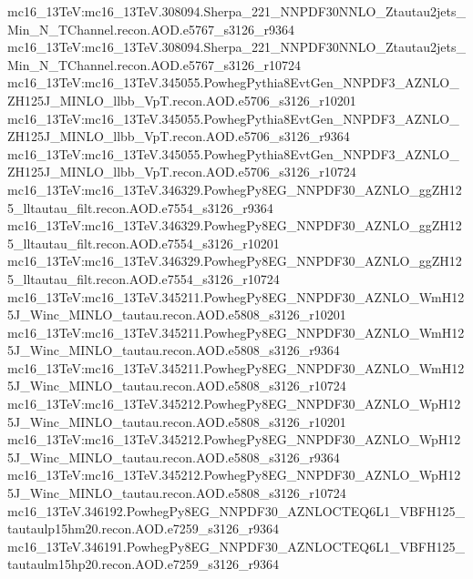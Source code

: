 { mc16\_13TeV:mc16\_13TeV.308094.Sherpa\_221\_NNPDF30NNLO\_Ztautau2jets\_Min\_N\_TChannel.recon.AOD.e5767\_s3126\_r9364 \newline    
 mc16\_13TeV:mc16\_13TeV.308094.Sherpa\_221\_NNPDF30NNLO\_Ztautau2jets\_Min\_N\_TChannel.recon.AOD.e5767\_s3126\_r10724  \newline  
 mc16\_13TeV:mc16\_13TeV.345055.PowhegPythia8EvtGen\_NNPDF3\_AZNLO\_ZH125J\_MINLO\_llbb\_VpT.recon.AOD.e5706\_s3126\_r10201  \newline   
 mc16\_13TeV:mc16\_13TeV.345055.PowhegPythia8EvtGen\_NNPDF3\_AZNLO\_ZH125J\_MINLO\_llbb\_VpT.recon.AOD.e5706\_s3126\_r9364  \newline   
 mc16\_13TeV:mc16\_13TeV.345055.PowhegPythia8EvtGen\_NNPDF3\_AZNLO\_ZH125J\_MINLO\_llbb\_VpT.recon.AOD.e5706\_s3126\_r10724  \newline   
 mc16\_13TeV:mc16\_13TeV.346329.PowhegPy8EG\_NNPDF30\_AZNLO\_ggZH125\_lltautau\_filt.recon.AOD.e7554\_s3126\_r9364 \newline    
 mc16\_13TeV:mc16\_13TeV.346329.PowhegPy8EG\_NNPDF30\_AZNLO\_ggZH125\_lltautau\_filt.recon.AOD.e7554\_s3126\_r10201  \newline   
 mc16\_13TeV:mc16\_13TeV.346329.PowhegPy8EG\_NNPDF30\_AZNLO\_ggZH125\_lltautau\_filt.recon.AOD.e7554\_s3126\_r10724  \newline   
 mc16\_13TeV:mc16\_13TeV.345211.PowhegPy8EG\_NNPDF30\_AZNLO\_WmH125J\_Winc\_MINLO\_tautau.recon.AOD.e5808\_s3126\_r10201  \newline   
 mc16\_13TeV:mc16\_13TeV.345211.PowhegPy8EG\_NNPDF30\_AZNLO\_WmH125J\_Winc\_MINLO\_tautau.recon.AOD.e5808\_s3126\_r9364 \newline    
 mc16\_13TeV:mc16\_13TeV.345211.PowhegPy8EG\_NNPDF30\_AZNLO\_WmH125J\_Winc\_MINLO\_tautau.recon.AOD.e5808\_s3126\_r10724 \newline    
 mc16\_13TeV:mc16\_13TeV.345212.PowhegPy8EG\_NNPDF30\_AZNLO\_WpH125J\_Winc\_MINLO\_tautau.recon.AOD.e5808\_s3126\_r10201  \newline   
 mc16\_13TeV:mc16\_13TeV.345212.PowhegPy8EG\_NNPDF30\_AZNLO\_WpH125J\_Winc\_MINLO\_tautau.recon.AOD.e5808\_s3126\_r9364  \newline   
 mc16\_13TeV:mc16\_13TeV.345212.PowhegPy8EG\_NNPDF30\_AZNLO\_WpH125J\_Winc\_MINLO\_tautau.recon.AOD.e5808\_s3126\_r10724 \newline    
mc16\_13TeV.346192.PowhegPy8EG\_NNPDF30\_AZNLOCTEQ6L1\_VBFH125\_tautaulp15hm20.recon.AOD.e7259\_s3126\_r9364\newline  
mc16\_13TeV.346191.PowhegPy8EG\_NNPDF30\_AZNLOCTEQ6L1\_VBFH125\_tautaulm15hp20.recon.AOD.e7259\_s3126\_r9364\newline  
}
